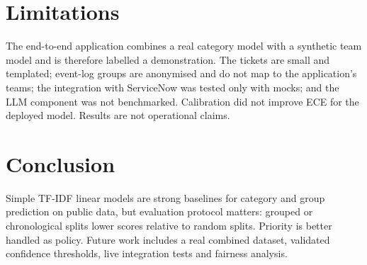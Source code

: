 \documentclass[conference]{IEEEtran}
\begin{document}
\section{Limitations}
The end-to-end application combines a real category model with a synthetic team model and is therefore labelled a demonstration. The tickets are small and templated; event-log groups are anonymised and do not map to the application's teams; the integration with ServiceNow was tested only with mocks; and the LLM component was not benchmarked. Calibration did not improve ECE for the deployed model. Results are not operational claims.

\section{Conclusion}
Simple TF-IDF linear models are strong baselines for category and group prediction on public data, but evaluation protocol matters: grouped or chronological splits lower scores relative to random splits. Priority is better handled as policy. Future work includes a real combined dataset, validated confidence thresholds, live integration tests and fairness analysis.



\end{document}
